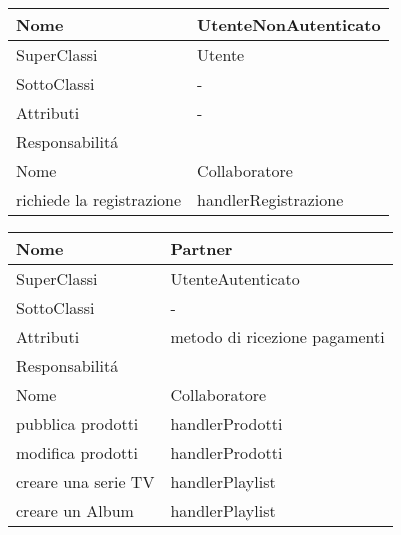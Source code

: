 \begin{center}
    \begin{tabular}{ |p{3cm}|p{3cm}|p{3cm}|p{3cm}| }
        \hline
        Nome & \multicolumn{3}{|p{9cm}|}{UtenteNonAutenticato} \\\hline
        SuperClassi & \multicolumn{3}{|p{9cm}|}{Utente} \\\hline
        SottoClassi & \multicolumn{3}{|p{9cm}|}{-} \\\hline
        Attributi & \multicolumn{3}{|p{9cm}|}{- } \\\hline
        \multicolumn{4}{|p{12cm}|}{Responsabilit\'a} \\\hline
        \multicolumn{2}{|p{6cm}|}{Nome} & \multicolumn{2}{|p{6cm}|}{Collaboratore} \\\hline
        \multicolumn{2}{|p{6cm}|}{richiede la registrazione} & \multicolumn{2}{|p{6cm}|}{handlerRegistrazione} \\\hline
    \end{tabular}
\end{center}

\begin{center}
    \begin{tabular}{ |p{3cm}|p{3cm}|p{3cm}|p{3cm}| }
        \hline
        Nome & \multicolumn{3}{|p{9cm}|}{Partner} \\\hline
        SuperClassi & \multicolumn{3}{|p{9cm}|}{UtenteAutenticato} \\\hline
        SottoClassi & \multicolumn{3}{|p{9cm}|}{-} \\\hline
        Attributi & \multicolumn{3}{|p{9cm}|}{metodo di ricezione pagamenti } \\\hline
        \multicolumn{4}{|p{12cm}|}{Responsabilit\'a} \\\hline
        \multicolumn{2}{|p{6cm}|}{Nome} & \multicolumn{2}{|p{6cm}|}{Collaboratore} \\\hline
        \multicolumn{2}{|p{6cm}|}{pubblica prodotti} & \multicolumn{2}{|p{6cm}|}{handlerProdotti} \\\hline
        \multicolumn{2}{|p{6cm}|}{modifica prodotti} & \multicolumn{2}{|p{6cm}|}{handlerProdotti} \\\hline
        \multicolumn{2}{|p{6cm}|}{creare una serie TV} & \multicolumn{2}{|p{6cm}|}{handlerPlaylist} \\\hline
        \multicolumn{2}{|p{6cm}|}{creare un Album} & \multicolumn{2}{|p{6cm}|}{handlerPlaylist} \\\hline
    \end{tabular}
\end{center}

